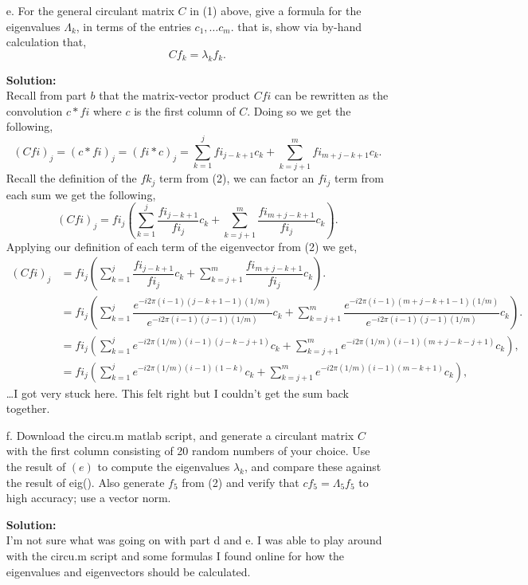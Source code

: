 \documentclass[12pt]{article}
\makeatletter
\theoremstyle{homework}
\newenvironment{exercise}[1]
{\def\@currentlabel{#1}\exercisecore}
{\endexercisecore}
\newcommand{\localhead}[1]{\par\smallskip\noindent\textbf{#1}\nobreak\\}%
\newcommand\solution{\localhead{Solution:}}
\makeatother
\begin{document}
\begin{exercise}{P23}
\begin{enumerate}
    \item[e.] For the general circulant matrix $C$ in (1) above, give a formula for the eigenvalues $\Lambda_k$, in terms of the entries $c_1,\dots c_m$.
    that is, show via by-hand calculation that, 
    \begin{equation*}
      Cf_k = \lambda_kf_k.
    \end{equation*}  

    \solution Recall from part $b$ that the matrix-vector product $Cfi$ can be rewritten as the convolution $c*fi$ where $c$ is the first column of $C$.
    Doing so we get the following, 
    \begin{equation*}
      (Cfi)_j = (c*fi)_j = (fi*c)_j = \sum_{k = 1}^j fi_{j - k + 1}c_k + \sum_{k = j+1}^m fi_{m + j - k + 1}c_k.
    \end{equation*} 
    Recall the definition of the $fk_j$ term from (2), we can factor an $fi_j$ term from each sum we get the following,
    \begin{equation*}
      (Cfi)_j = fi_j \left(\sum_{k = 1}^j \dfrac{fi_{j - k + 1}}{fi_j}c_k + \sum_{k = j+1}^m \dfrac{fi_{m + j - k + 1}}{fi_j}c_k\right).
    \end{equation*}
    Applying our definition of each term of the eigenvector from (2) we get, 
    \begin{align*}
      (Cfi)_j &= fi_j \left(\sum_{k = 1}^j \dfrac{fi_{j - k + 1}}{fi_j}c_k + \sum_{k = j+1}^m \dfrac{fi_{m + j - k + 1}}{fi_j}c_k\right).\\
      &= fi_j \left(\sum_{k = 1}^j \dfrac{e^{-i 2 \pi (i - 1) (j - k + 1 - 1)(1/m)}}{e^{-i 2 \pi(i - 1)(j - 1) (1/m) }}c_k + \sum_{k = j+1}^m \dfrac{e^{-i 2 \pi (i - 1) (m + j - k + 1 - 1)(1/m)}}{e^{-i 2 \pi(i - 1)(j - 1)(1/m)}}c_k\right).\\
      &= fi_j \left(\sum_{k = 1}^j e^{-i 2 \pi (1/m) (i - 1) (j - k - j + 1)} c_k + \sum_{k = j+1}^m e^{-i 2 \pi (1/m) (i - 1) (m + j - k - j + 1)} c_k \right),\\
      &= fi_j \left(\sum_{k = 1}^j e^{-i 2 \pi (1/m) (i - 1) (1 - k) } c_k + \sum_{k = j+1}^m e^{-i 2 \pi (1/m) (i - 1) (m - k + 1)} c_k \right),
    \end{align*}
    \dots I got very stuck here. This felt right but I couldn't get the sum back together.
    \vspace{1in}

    \item[f.] Download the circu.m matlab script, and generate a circulant matrix $C$ with the first column consisting of 20 random numbers of your choice. 
    Use the result of $(e)$ to compute the eigenvalues $\lambda_k$, and compare these against the result of eig(). Also generate $f_5$ from (2) and verify that 
    $cf_5 = \Lambda_5f_5$ to high accuracy; use a vector norm. \\
    \solution  I'm not sure what was going on with part d and e. I was able to play around with the circu.m script and some formulas I found online for how the eigenvalues and eigenvectors should be 
    calculated. 



     
  \end{enumerate}
  
\end{exercise}
\end{document}
